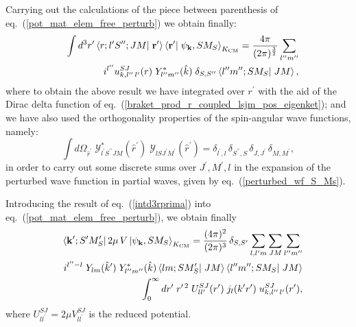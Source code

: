 \documentclass[aps,twocolumn,showpacs,preprintnumbers,amsmath,amssymb,nofootinbib,superscriptaddress,showkeys,noeprint]{revtex4-1}
\newcommand{\nk}{{\bf k}}
\newcommand{\nr}{{\bf r}}
\begin{document}
Carrying out the calculations of the piece between parenthesis of
eq.~(\ref{pot_mat_elem_free_perturb}) we obtain finally:
\begin{eqnarray}
 &&\int d^3r^\prime
\left\langle r;l^\prime 
S^{\prime\prime};JM\right|\left.
\nr^\prime\right\rangle
\left\langle \nr^\prime\right|
\left. \psi_{\nk},S M_S
\right\rangle_{K_{\rm CM}}=\frac{4\pi}{(2\pi)^\frac32}
\sum_{l^{\prime\prime}
m^{\prime\prime}}
\nonumber\\
&& i^{l^{\prime\prime}}
u^{SJ}_{k,l^{\prime\prime}\,
l^\prime}(r)\;
Y^*_{l^{\prime\prime}m^{\prime\prime}}(\hat{k})\;
\delta_{S,S^{\prime\prime}} \left\langle 
l^{\prime\prime} m^{\prime\prime};S M_S 
\right|\left. JM
\right\rangle,
\label{intd3rprima}
\end{eqnarray}
where to obtain the above result we have integrated over $r^\prime$
with the aid of the Dirac delta function of
eq.~(\ref{braket_prod_r_coupled_lsjm_pos_eigenket}); and we have also
used the orthogonality properties of the spin-angular wave functions,
namely:
\begin{equation}\label{orthogonality_spin_angular_wf}
 \int d\Omega_{\hat{r}^\prime}\;
 \mathcal{Y}^{*}_{l^\prime S^{\prime\prime}JM}(\hat{r}^\prime)\;
 \mathcal{Y}_{l S J^\prime M^\prime}(\hat{r}^\prime)=
 \delta_{l^\prime,l}\,
 \delta_{S^{\prime\prime},S}\,
\delta_{J, J^\prime}\,
\delta_{M, M^\prime},
\end{equation}
in order to carry out some discrete sums over $J^\prime,M^\prime,l$ in
the expansion of the perturbed wave function in partial waves, given
by eq.~(\ref{perturbed_wf_S_Ms}).

Introducing the result of eq.~(\ref{intd3rprima}) into
eq.~(\ref{pot_mat_elem_free_perturb}), we obtain finally
\begin{eqnarray}
 &&\left\langle \nk^\prime; S^\prime M^\prime_S \right| 2\mu\, V  
\left| \psi_{\nk}, S M_S \right\rangle_{K_{\rm CM}}=\frac{(4\pi)^2}{(2\pi)^3}\,
\delta_{S,S^\prime}
\sum_{l,l^\prime m}
\sum_{JM}\sum_{l^{\prime\prime}m^{\prime\prime}}\nonumber\\
&&i^{l^{\prime\prime}-l}
\;Y_{lm}(\hat{k}^\prime)
\;Y^*_{l^{\prime\prime}m^{\prime\prime}}(\hat{k})\left\langle
lm;SM^\prime_S\right|
\left. JM\right\rangle
\left\langle l^{\prime\prime}m^{\prime\prime};SM_S
\right|\left. JM
\right\rangle\nonumber\\
&&\int^\infty_0 dr^\prime
\; r^{\prime\,2}\;
U^{SJ}_{l l^\prime}(r^\prime)\;j_l(k^\prime
r^\prime)\;u^{SJ}_{k,l^{\prime\prime}\,l^\prime}(r^\prime),
\label{2muV_matrix_elem_final}
\end{eqnarray}
where $U^{SJ}_{l l^\prime}=2\mu V^{SJ}_{l l^\prime}$ is the reduced
potential.
\end{document}
